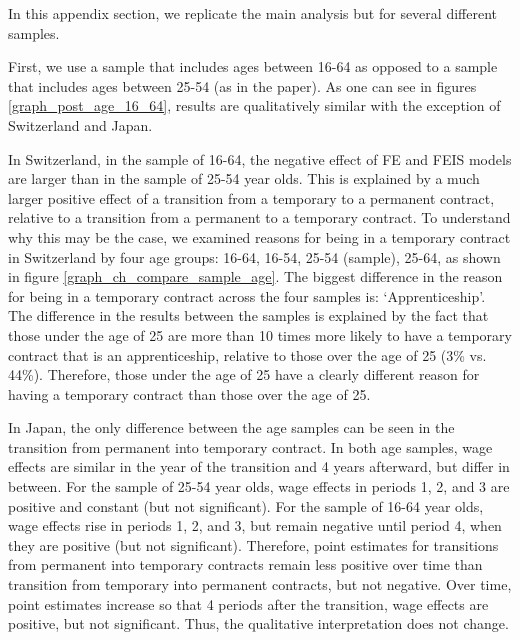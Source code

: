 In this appendix section, we replicate the main analysis but for several different samples.  

First, we use a sample that includes ages between 16-64 as opposed to a sample that includes ages between 25-54 (as in the paper).  As one can see in figures \ref{graph_post_age_16_64}, results are qualitatively similar with the exception of Switzerland and Japan.  

In Switzerland, in the sample of 16-64, the negative effect of FE and FEIS models are larger than in the sample of 25-54 year olds.  This is explained by a much larger positive effect of a transition from a temporary to a permanent contract, relative to a transition from a permanent to a temporary contract.  To understand why this may be the case, we examined reasons for being in a temporary contract in Switzerland by four age groups: 16-64, 16-54, 25-54 (sample), 25-64, as shown in figure \ref{graph_ch_compare_sample_age}.  The biggest difference in the reason for being in a temporary contract across the four samples is: `Apprenticeship'.  The difference in the results between the samples is explained by the fact that those under the age of 25 are more than 10 times more likely to have a temporary contract that is an apprenticeship, relative to those over the age of 25 (3\% vs. 44\%).  Therefore, those under the age of 25 have a clearly different reason for having a temporary contract than those over the age of 25.  

In Japan, the only difference between the age samples can be seen in the transition from permanent into temporary contract.  In both age samples, wage effects are similar in the year of the transition and 4 years afterward, but differ in between.  For the sample of 25-54 year olds, wage effects in periods 1, 2, and 3 are positive and constant (but not significant).  For the sample of 16-64 year olds, wage effects rise in periods 1, 2, and 3, but remain negative until period 4, when they are positive (but not significant).  Therefore, point estimates for transitions from permanent into temporary contracts remain less positive over time than transition from temporary into permanent contracts, but not negative.  Over time, point estimates increase so that 4 periods after the transition, wage effects are positive, but not significant.  Thus, the qualitative interpretation does not change.

